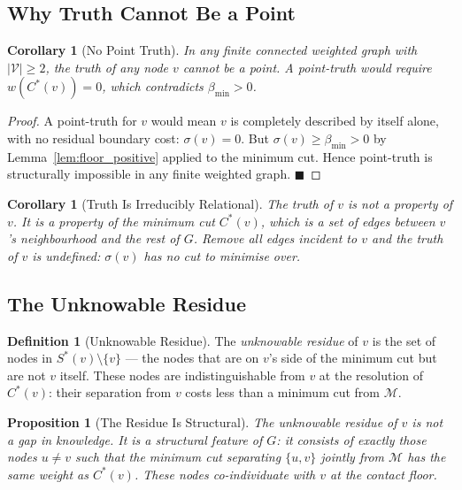 \documentclass[12pt, a4paper]{article}
\theoremstyle{plain}
\newtheorem{corollary}[theorem]{Corollary}
\newtheorem{proposition}[theorem]{Proposition}
\theoremstyle{definition}
\newtheorem{definition}[theorem]{Definition}
\theoremstyle{remark}
\newcommand{\med}{\mathcal{M}}
\newcommand{\Vcal}{\mathcal{V}}
\newcommand{\bmin}{\beta_{\min}}
\newcommand{\qed}{\hfill$\blacksquare$}
\begin{document}
\subsection{Why Truth Cannot Be a Point}

\begin{corollary}[No Point Truth]
\label{cor:no_point}
In any finite connected weighted graph with $|\Vcal| \geq 2$, the truth of
any node $v$ cannot be a point. A point-truth would require $w(C^*(v)) = 0$,
which contradicts $\bmin > 0$.
\end{corollary}

\begin{proof}
A point-truth for $v$ would mean $v$ is completely described by itself alone,
with no residual boundary cost: $\sigma(v) = 0$. But $\sigma(v) \geq \bmin > 0$
by Lemma~\ref{lem:floor_positive} applied to the minimum cut. Hence point-truth
is structurally impossible in any finite weighted graph. \qed
\end{proof}

\begin{corollary}[Truth Is Irreducibly Relational]
\label{cor:relational}
The truth of $v$ is not a property of $v$. It is a property of the minimum
cut $C^*(v)$, which is a set of edges between $v$'s neighbourhood and the
rest of $G$. Remove all edges incident to $v$ and the truth of $v$ is
undefined: $\sigma(v)$ has no cut to minimise over.
\end{corollary}

\subsection{The Unknowable Residue}

\begin{definition}[Unknowable Residue]
\label{def:unknowable}
The \emph{unknowable residue} of $v$ is the set of nodes in $S^*(v)
\setminus \{v\}$ --- the nodes that are on $v$'s side of the minimum cut
but are not $v$ itself. These nodes are indistinguishable from $v$ at the
resolution of $C^*(v)$: their separation from $v$ costs less than a minimum
cut from $\med$.
\end{definition}

\begin{proposition}[The Residue Is Structural]
\label{prop:residue}
The unknowable residue of $v$ is not a gap in knowledge. It is a structural
feature of $G$: it consists of exactly those nodes $u \neq v$ such that the
minimum cut separating $\{u, v\}$ jointly from $\med$ has the same weight as
$C^*(v)$. These nodes co-individuate with $v$ at the contact floor.
\end{proposition}
\end{document}
